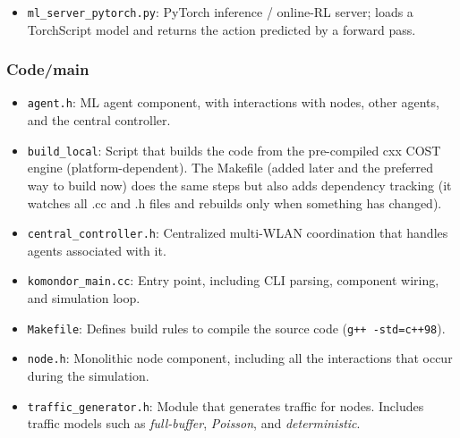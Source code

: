 \documentclass[11pt,a4paper]{article}
\begin{document}
\begin{itemize}
\begin{itemize}
        \item \texttt{ml\_server\_pytorch.py}: PyTorch inference / online-RL server; loads a TorchScript model and returns the action predicted by a forward pass.
    \end{itemize}
\end{itemize}


\subsubsection{Code/main}

\begin{itemize}
    \item \texttt{agent.h}: ML agent component, with interactions with nodes, other agents, and the central controller.
    \item \texttt{build\_local}: Script that builds the code from the pre-compiled cxx COST engine (platform-dependent). The Makefile (added later and the preferred way to build now) does the same steps but also adds dependency tracking (it watches all .cc and .h files and rebuilds only when something has changed).
    \item \texttt{central\_controller.h}: Centralized multi-WLAN coordination that handles agents associated with it.
    \item \texttt{komondor\_main.cc}: Entry point, including CLI parsing, component wiring, and simulation loop.
    \item \texttt{Makefile}: Defines build rules to compile the source code (\texttt{g++ -std=c++98}).
    \item \texttt{node.h}: Monolithic node component, including all the interactions that occur during the simulation.
    \item \texttt{traffic\_generator.h}: Module that generates traffic for nodes. Includes traffic models such as \textit{full-buffer}, \textit{Poisson}, and \textit{deterministic}.
\end{itemize}
\end{document}
